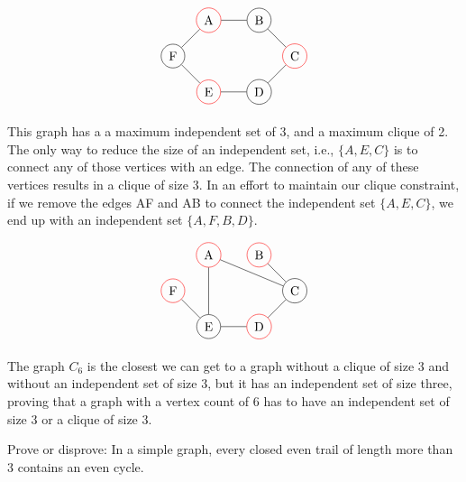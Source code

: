 \documentclass[12pt]{article}
\newenvironment{question}[2][Question]{\begin{trivlist}
\item[\hskip \labelsep {\bfseries #1}\hskip \labelsep {\bfseries #2.}]}{\end{trivlist}}
\begin{document}
\begin{align*}
\begin{tikzpicture}
\node[shape=circle,draw=red] (A) at (1,2) {A};
\node[shape=circle,draw=black] (B) at (2.4142857,2) {B};
\node[shape=circle,draw=red] (C) at (3.4142856,1) {C};
\node[shape=circle,draw=black] (D) at (2.4142857,0) {D};
\node[shape=circle,draw=red] (E) at (1,0) {E};
\node[shape=circle,draw=black] (F) at (0,1) {F};
\path [] (A) edge node[left] {} (B);
\path [] (B) edge node[left] {} (C);
\path [] (C) edge node[left] {} (D);
\path [] (D) edge node[left] {} (E);
\path [] (F) edge node[left] {} (A);
\path [] (E) edge node[left] {} (F);
\end{tikzpicture}
\end{align*}

This graph has a a maximum independent set of 3, and a maximum clique of 2. The only way to reduce the size of an independent set, i.e., $\{A,E,C\}$ is to connect any of those vertices with an edge.  The connection of any of these vertices results in a clique of size 3.  In an effort to maintain our clique constraint, if we remove the edges AF and AB to connect the independent set $\{A,E,C\}$, we end up with an independent set $\{A,F,B, D\}$.

\begin{align*}
\begin{tikzpicture}
\node[shape=circle,draw=red] (A) at (1,2) {A};
\node[shape=circle,draw=red] (B) at (2.4142857,2) {B};
\node[shape=circle,draw=black] (C) at (3.4142856,1) {C};
\node[shape=circle,draw=red] (D) at (2.4142857,0) {D};
\node[shape=circle,draw=black] (E) at (1,0) {E};
\node[shape=circle,draw=red] (F) at (0,1) {F};
\path [] (A) edge node[left] {} (C);
\path [] (B) edge node[left] {} (C);
\path [] (C) edge node[left] {} (D);
\path [] (D) edge node[left] {} (E);
\path [] (E) edge node[left] {} (A);
\path [] (E) edge node[left] {} (F);
\end{tikzpicture}
\end{align*}

The graph $C_6$ is the closest we can get to a graph without a clique of size 3 and without an independent set of size 3, but it has an independent set of size three, proving that a graph with a vertex count of 6 has to have an independent set of size 3 or a clique of size 3.

\begin{question}{2}
Prove or disprove: In a simple graph, every closed even trail of length more than 3 contains an even cycle.
\end{question}
\end{document}
